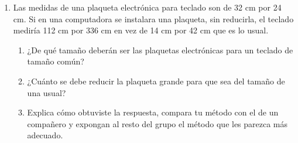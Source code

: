 \begin{enumerate}
    \item Las medidas de una plaqueta electrónica para teclado son de 32 cm por 24 cm. Si
          en una computadora se instalara una plaqueta, sin reducirla, el teclado mediría
          112 cm por 336 cm en vez de 14 cm por 42 cm que es lo usual.
          \begin{enumerate}
              \item ¿De qué tamaño deberán ser las plaquetas electrónicas para un teclado de tamaño común?
              \item ¿Cuánto se debe reducir la plaqueta grande para que sea del tamaño de una usual?
              \item Explica cómo obtuviste la respuesta, compara tu método con el de un compañero
                    y expongan al resto del grupo el método que les parezca más adecuado.
          \end{enumerate}


\end{enumerate}
